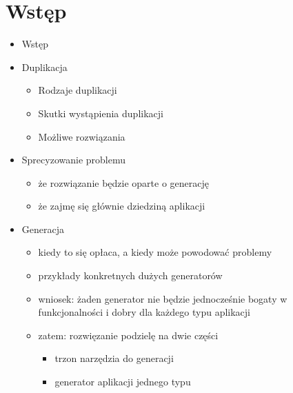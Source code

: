 \chapter{Wstęp} \label{chap:intro}

\begin{itemize}

 \item Wstęp
 
 \item Duplikacja
  \begin{itemize}
   \item Rodzaje duplikacji
   \item Skutki wystąpienia duplikacji
   \item Możliwe rozwiązania
  \end{itemize}
 
 \item Sprecyzowanie problemu
  \begin{itemize}
   \item że rozwiązanie będzie oparte o generację
   \item że zajmę się głównie dziedziną aplikacji
  \end{itemize}
 
 \item Generacja
  \begin{itemize}
   \item kiedy to się opłaca, a kiedy może powodować problemy
   \item przykłady konkretnych dużych generatorów
   \item wniosek: żaden generator nie będzie jednocześnie bogaty w funkcjonalności i dobry dla każdego typu aplikacji
   \item zatem: rozwięzanie podzielę na dwie części
    \begin{itemize}
     \item trzon narzędzia do generacji
     \item generator aplikacji jednego typu
    \end{itemize}
  \end{itemize}
 

\end{itemize}
